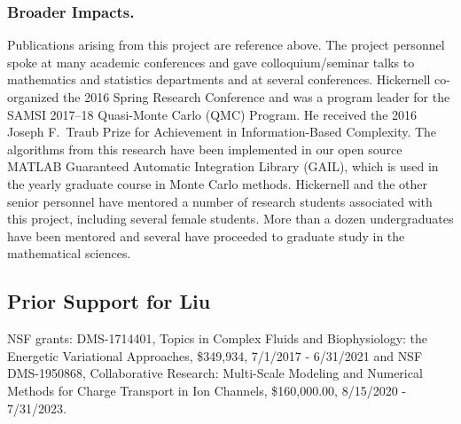 \documentclass[11pt]{NSFamsart}
\begin{document}
\subsubsection*{Broader Impacts.}
Publications arising from this project are reference above.  
The project personnel spoke at many academic conferences and gave colloquium/seminar talks to mathematics and statistics departments and at several conferences.  Hickernell co-organized the 2016 Spring Research Conference and was a program leader for the SAMSI 2017--18 Quasi-Monte Carlo (QMC) Program.   He received the 2016 Joseph F.\ Traub Prize for Achievement in Information-Based Complexity. The algorithms from this research have been implemented in our open source MATLAB Guaranteed Automatic Integration Library (GAIL), which is used in the yearly graduate course in Monte Carlo methods.  Hickernell and the other senior personnel have mentored a number of research students associated with this project, including several female students.  More than a dozen undergraduates have been mentored and several have proceeded to graduate study in the mathematical sciences. 


\subsection*{Prior Support for Liu} NSF grants: DMS-1714401,  Topics in Complex Fluids and Biophysiology: the Energetic Variational Approaches, \$349,934, 7/1/2017 - 6/31/2021 and 
{NSF DMS-1950868, Collaborative Research: Multi-Scale Modeling and Numerical Methods for Charge Transport in Ion Channels, \$160,000.00, 8/15/2020 - 7/31/2023.}
\end{document}
